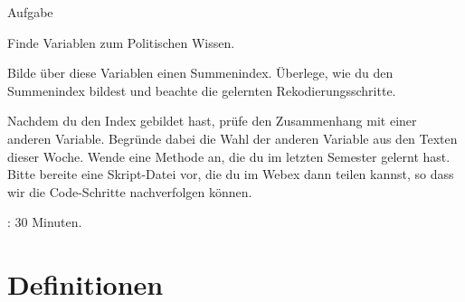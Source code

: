 \documentclass[11pt]{beamer}
\begin{document}
\begin{frame}{Aufgabe}

	\begin{nolist}
		\item Finde Variablen zum Politischen Wissen. 
		\item Bilde über diese Variablen einen Summenindex. Überlege, wie du den Summenindex bildest und beachte die gelernten Rekodierungsschritte.
		\item Nachdem du den Index gebildet hast, prüfe den Zusammenhang mit einer anderen Variable. Begründe dabei die Wahl der anderen Variable aus den Texten dieser Woche. Wende eine Methode an, die du im letzten Semester gelernt hast. 
Bitte bereite eine Skript-Datei vor, die du im Webex dann teilen kannst, so dass wir die Code-Schritte nachverfolgen können.
	\end{nolist}

: 30 Minuten.
\end{frame}

\section{Definitionen}

\end{document}
